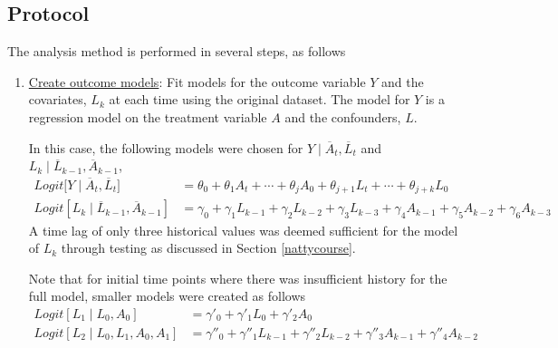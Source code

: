 \subsection{Protocol} 
The analysis method is performed in several steps, as follows 
\begin{enumerate}  

\item \underline{Create outcome models}: Fit models for the outcome variable $Y$ and the covariates, $L_k$ at each time using the original dataset.  The model for $Y$ is a regression model on the treatment variable $A$ and the confounders, $L$. \label{st1}

In this case, the following models were chosen for $Y \mid  \overline{A}_t, \overline{L}_t$ and $L_k \mid \overline{L}_{k-1}, \overline{A}_{k-1}$, 
\begin{align} 
Logit \big[Y \mid \overline{A}_t, \overline{L}_t \big] &= \theta_{0} + \theta_1 A_{t} + \cdots + \theta_j A_0 + \theta_{j+1} L_t + \cdots + \theta_{j+k} L_0 \label{eq:4} \\ 
Logit[L_k \mid \overline{L}_{k-1}, \overline{A}_{k-1}] &= \gamma_0 + \gamma_1 L_{k-1} + \gamma_2 L_{k-2} + \gamma_3 L_{k-3}  + \gamma_4 A_{k-1} + \gamma_5 A_{k-2} + \gamma_6 A_{k-3} \label{eq:5} 
\end{align} 
A time lag of only three historical values was deemed sufficient for the model of $L_k$ through testing as discussed in Section \ref{nattycourse}. 


Note that for initial time points where there was insufficient history for the full model, smaller models were created as follows 
\begin{align} 
Logit[L_1 \mid L_0, A_0]  &= \gamma'_0 + \gamma'_1 L_0 +  \gamma'_2 A_0 \label{eq:6} \\
Logit[L_2 \mid L_0, L_1, A_0, A_1] &= \gamma''_0 + \gamma''_1 L_{k-1} + \gamma''_2 L_{k-2}   + \gamma''_3 A_{k-1} + \gamma''_4 A_{k-2} \label{eq:7}
\end{align}



\end{enumerate}

